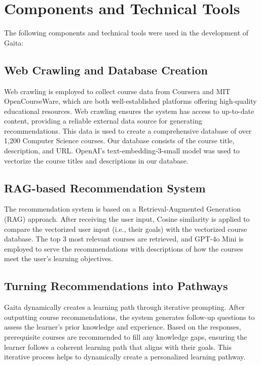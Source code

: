\section{Components and Technical Tools}

The following components and technical tools were used in the development of Gaita: 

\subsection{Web Crawling and Database Creation}

Web crawling is employed to collect course data from Coursera and MIT OpenCourseWare, which are both well-established platforms offering high-quality educational resources. Web crawling ensures the system has access to up-to-date content, providing a reliable external data source for generating recommendations. This data is used to create a comprehensive database of over 1,200 Computer Science courses. Our database consists of the course title, description, and URL. OpenAI’s text-embedding-3-small model was used to vectorize the course titles and descriptions in our database. 

\subsection{RAG-based Recommendation System}

The recommendation system is based on a Retrieval-Augmented Generation (RAG) approach. After receiving the user input, Cosine similarity is applied to compare the vectorized user input (i.e., their goals) with the vectorized course database. The top 3 most relevant courses are retrieved, and GPT-4o Mini is employed to serve the recommendations with descriptions of how the courses meet the user’s learning objectives.


\subsection{Turning Recommendations into Pathways}

Gaita dynamically creates a learning path through iterative prompting. After outputting course recommendations, the system generates follow-up questions to assess the learner's prior knowledge and experience. Based on the responses, prerequisite courses are recommended to fill any knowledge gaps, ensuring the learner follows a coherent learning path that aligns with their goals. This iterative process helps to dynamically create a personalized learning pathway.




